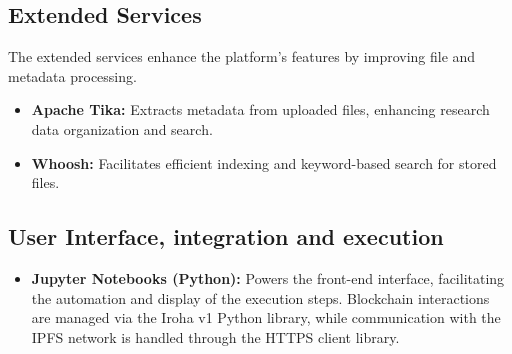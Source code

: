 \documentclass[final]{rc-book-2.14}
\begin{document}
\subsection{Extended Services}

The extended services enhance the platform's features by improving file and metadata processing.

\begin{itemize}
    \item \textbf{Apache Tika:} Extracts metadata from uploaded files, enhancing research data organization and search.
    \item \textbf{Whoosh:} Facilitates efficient indexing and keyword-based search for stored files.
\end{itemize}


\subsection{User Interface, integration and execution}

\begin{itemize}
    \item \textbf{Jupyter Notebooks (Python):} Powers the front-end interface, facilitating the automation and display of the execution steps. Blockchain interactions are managed via the Iroha v1 Python library, while communication with the IPFS network is handled through the HTTPS client library.
\end{itemize}
\end{document}
